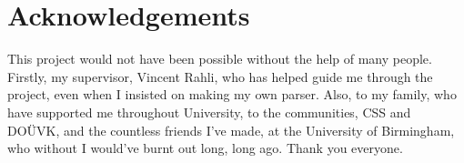 
\section*{Acknowledgements}
This project would not have been possible without the help of many people. Firstly, my supervisor, Vincent Rahli, who has helped guide me through the project, even when I insisted on making my own parser. Also, to my family, who have supported me throughout University, to the communities, CSS and DOÜVK, and the countless friends I've made, at the University of Birmingham, who without I would've burnt out long, long ago. Thank you everyone.